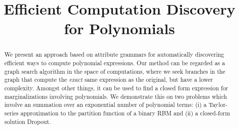 \documentclass[]{article}
\title{Efficient Computation Discovery for Polynomials}
\numberwithin{equation}{section}
\begin{document}
 

\maketitle





 

\begin{abstract} We present an approach based on attribute grammars
  for automatically discovering efficient ways to compute polynomial
  expressions. Our method can be regarded as
  a graph search algorithm in the space of computations, where we seek
  branches in the graph that compute the {\em exact} same expression as
  the original, but have a lower complexity. Amongst other things, it can be used
  to find a closed form expression for marginalizations involving
  polynomials. We demonstrate this on two problems which involve an
  summation over an exponential number of polynomial terms: (i) a
  Taylor-series approximation to the partition function of a binary
  RBM and (ii) a closed-form solution Dropout. 
 \end{abstract} 










\nocite{*}


\end{document}
